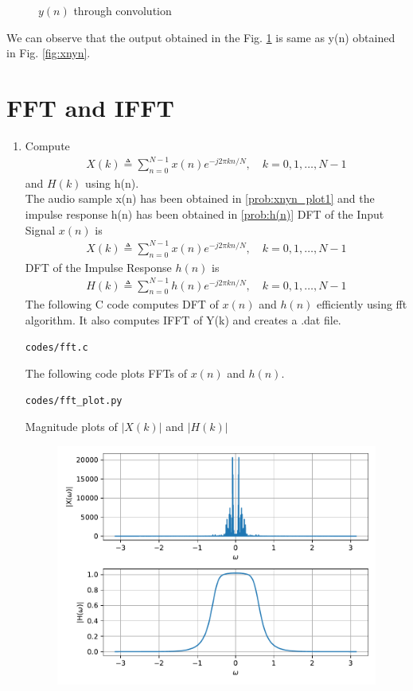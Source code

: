 \documentclass[journal,12pt,twocolumn]{IEEEtran}
\renewcommand\thesection{\arabic{section}}
\begin{document}
\begin{enumerate}[label=\thesection.\arabic*,ref=\thesection.\theenumi]
\begin{figure}[!ht]
\caption{$y(n)$ through convolution}
\label{fig:yn_conv}
\end{figure}
We can observe that the output obtained in the Fig. \ref{fig:yn_conv} is same as y(n) obtained in Fig. \ref{fig:xnyn}.
\end{enumerate}



\section{FFT and IFFT}
\begin{enumerate}[label=\thesection.\arabic*
,ref=\thesection.\theenumi]
\item Compute
\begin{align}
        X(k) \triangleq \sum_{n=0}^{N-1} x(n) e^{-j 2 \pi k n / N}, \quad k=0,1, \ldots, N-1
\end{align}
and $H(k)$ using h(n).
\\
\solution
The audio sample x(n) has been obtained in \ref{prob:xnyn_plot1} and the impulse response h(n) has been obtained in \ref{prob:h(n)} 
DFT of the Input Signal $x(n)$ is 
\begin{align}
    X(k) \triangleq \sum_{n=0}^{N-1} x(n) e^{-j 2 \pi k n / N}, \quad k=0,1, \ldots, N-1
\end{align}
DFT of the Impulse Response $h(n)$ is 
\begin{align}
    H(k) \triangleq \sum_{n=0}^{N-1} h(n) e^{-j 2 \pi k n / N}, \quad k=0,1, \ldots, N-1
\end{align}
The following C code computes DFT of $x(n)$ and $h(n)$ efficiently using fft algorithm. It also computes IFFT of Y(k) and creates a .dat file.
\begin{lstlisting}
codes/fft.c
\end{lstlisting}
The following code plots FFTs of $x(n)$ and $h(n)$.
\begin{lstlisting}
codes/fft_plot.py
\end{lstlisting}
Magnitude plots of $|X(k)|$ and $|H(k)|$
\begin{figure}[!ht]
\centering
\includegraphics[width=\columnwidth]{./figs/fft}

\end{figure}
\end{enumerate}
\end{document}
